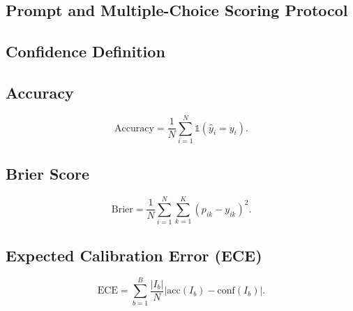 \documentclass[runningheads]{llncs}
\begin{document}
\subsection{Prompt and Multiple-Choice Scoring Protocol}

\subsection{Confidence Definition}

\subsection{Accuracy}
\begin{equation}
	\mathrm{Accuracy} = \frac{1}{N}\sum_{i=1}^{N}
	\mathbb{1}(\hat{y}_i=y_i).
	\label{eq:accuracy}
\end{equation}

\subsection{Brier Score}
\begin{equation}
	\mathrm{Brier} =
	\frac{1}{N}\sum_{i=1}^{N}\sum_{k=1}^{K}
	(p_{ik}-y_{ik})^2.
	\label{eq:brier}
\end{equation}

\subsection{Expected Calibration Error (ECE)}
\begin{equation}
	\mathrm{ECE} =
	\sum_{b=1}^{B}\frac{|I_b|}{N}
	\left|\mathrm{acc}(I_b)-\mathrm{conf}(I_b)\right|.
	\label{eq:ece}
\end{equation}
\end{document}
